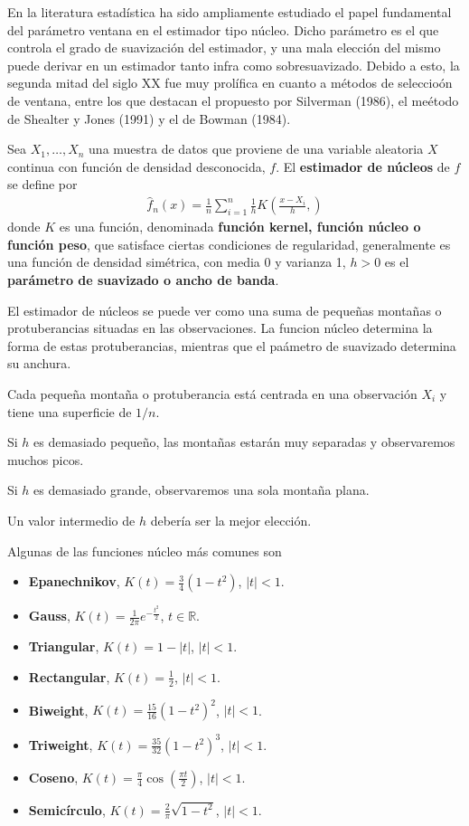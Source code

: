 En la literatura estadística ha sido ampliamente estudiado el papel fundamental del parámetro ventana en el estimador tipo núcleo. Dicho parámetro es el que controla el grado de suavización del estimador, y una mala elección del mismo puede derivar en un estimador tanto infra como sobresuavizado. Debido a esto, la segunda mitad del siglo XX fue muy prolífica en cuanto a métodos de seleccioón de ventana, entre los que destacan el propuesto por Silverman (1986), el meétodo de Shealter y Jones (1991) y el de Bowman (1984).

\begin{defi}
    Sea $X_1,\ldots, X_n$ una muestra de datos que proviene de una variable aleatoria $X$ continua con función de densidad desconocida, $f$. El \textbf{estimador de núcleos} de $f$ se define por
    \begin{align*}
        \hat{f}_n(x) = \frac{1}{n} \sum_{i=1}^{n} \frac{1}{h} K\left( \frac{x - X_i}{h}, \right)
    \end{align*}
    donde $K$ es una función, denominada \textbf{función kernel, función núcleo o función peso}, que satisface ciertas condiciones de regularidad, generalmente es una función de densidad simétrica, con media 0 y varianza 1, $h > 0$ es el \textbf{parámetro de suavizado o ancho de banda}.
\end{defi}
El estimador de núcleos se puede ver como una suma de pequeñas montañas o protuberancias
situadas en las observaciones. La funcion núcleo determina la forma de estas protuberancias,
mientras que el paámetro de suavizado determina su anchura.

Cada pequeña montaña o protuberancia está centrada en una observación $X_i$ y tiene una superficie de $1/n$.

Si $h$ es demasiado pequeño, las montañas estarán muy separadas y observaremos muchos picos.

Si $h$ es demasiado grande, observaremos una sola montaña plana.

Un valor intermedio de $h$ debería ser la mejor elección.

Algunas de las funciones núcleo más comunes son
\begin{itemize}
    \item \textbf{Epanechnikov}, $K(t) = \frac{3}{4}(1-t^2)$, $|t| < 1$.
    \item \textbf{Gauss}, $K(t) = \frac{1}{2\pi} e^{-\frac{t^2}{2}}$, $t \in \mathbb{R}$.
    \item \textbf{Triangular}, $K(t) = 1 - |t|$, $|t| < 1$.
    \item \textbf{Rectangular}, $K(t) = \frac{1}{2}$, $|t| < 1$.
    \item \textbf{Biweight}, $K(t) = \frac{15}{16}(1-t^2)^2$, $|t| < 1$.
    \item \textbf{Triweight}, $K(t) = \frac{35}{32}(1-t^2)^3$, $|t| < 1$.
    \item \textbf{Coseno}, $K(t) = \frac{\pi}{4} \cos \left( \frac{\pi t}{2} \right)$, $|t| < 1$.
    \item \textbf{Semicírculo}, $K(t) = \frac{2}{\pi} \sqrt{1 -  t^2}$, $|t| < 1$.
\end{itemize}

